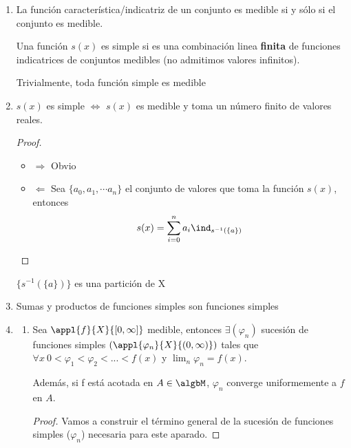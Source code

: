 \documentclass{apuntes}
\begin{document}
\begin{enumerate}
Así mismo, si la función $\appl{f}{X}{\cplex}$ es medible, entonces $sign(f)$ y $\abs{f}$ son medibles

\begin{proof}
La función signo es medible ya que es continua fuera del 0. Por tanto, la imagen inversa de un abierto que no contiene el 0 es un abierto medible. Si contiene al 0, la imagen inversa es un abierto $\cup$ $\{0\}$ que también es medible.
\end{proof}

\item La función característica/indicatriz de un conjunto es medible si y sólo si el conjunto es medible.

\begin{defn}
Una función $s(x)$ es simple si es una combinación linea \textbf{finita} de funciones indicatrices de conjuntos medibles (no admitimos valores infinitos).

Trivialmente, toda función simple es medible
\end{defn}

\item $s(x)$ es simple $\iff$ $s(x)$ es medible y toma un número finito de valores reales.
\begin{proof}
\begin{itemize}
\item $\Rightarrow$ Obvio
\item $\Leftarrow$ Sea $\{a_0, a_1, \cdots a_n\}$ el conjunto de valores que toma la función $s(x)$, entonces
\[s(x)= \sum_{i=0}^{n}a_i \ind_{s^{-1}(\{a\})}\]
\end{itemize}
\end{proof}

\obs $\{s^{-1}(\{a\})\}$ es una partición de X

\newpage
\item Sumas y productos de funciones simples son funciones simples

\item
\begin{enumerate}
\item Sea $\appl{f}{X}{[0,\infty]}$ medible, entonces $\exists (\varphi_n)$ sucesión de funciones simples $(\appl{\varphi_n}{X}{(0, \infty)})$ tales que
$\forall x \ 0 < \varphi_1 < \varphi_2 < ... < f(x)$ y $\lim_n \varphi_n = f(x)$.

Además, si f está acotada en $A \in \algbM$, $\varphi_n$ converge uniformemente a $f$ en $A$.

\begin{proof}
Vamos a construir el término general de la sucesión de funciones simples ($\varphi_n$) necesaria para este aparado.


\end{proof}
\end{enumerate}
\end{enumerate}
\end{document}
